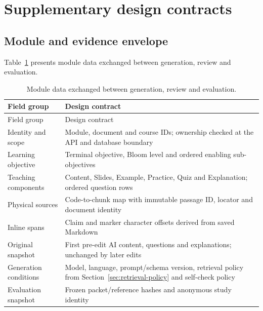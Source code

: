 \clearpage\section{Supplementary design contracts}
\subsection{Module and evidence envelope}
\par
Table~\ref{tab:12-design-details-1} presents module data exchanged between generation, review and evaluation.
\begin{longtable}{|p{4.0cm}|p{9.8cm}|}\caption{Module data exchanged between generation, review and evaluation.}\label{tab:12-design-details-1}\\\hline
Field group & Design contract\\\hline\endfirsthead
\hline Field group & Design contract\\\hline\endhead
Identity and scope & Module, document and course IDs; ownership checked at the API and database boundary\\\hline
Learning objective & Terminal objective, Bloom level and ordered enabling sub-objectives\\\hline
Teaching components & Content, Slides, Example, Practice, Quiz and Explanation; ordered question rows\\\hline
Physical sources & Code-to-chunk map with immutable passage ID, locator and document identity\\\hline
Inline spans & Claim and marker character offsets derived from saved Markdown\\\hline
Original snapshot & First pre-edit AI content, questions and explanations; unchanged by later edits\\\hline
Generation conditions & Model, language, prompt/schema version, retrieval policy from Section~\ref{sec:retrieval-policy} and self-check policy\\\hline
Evaluation snapshot & Frozen packet/reference hashes and anonymous study identity\\\hline
\end{longtable}
